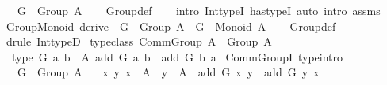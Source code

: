 \begin{isabellebody}
\ \ \ {\isachardoublequoteopen}G\ {\isacharcolon}{\kern0pt}\ Group\ A{\isachardoublequoteclose}\isanewline
%
\isadelimproof
\ \ %
\endisadelimproof
%
\isatagproof
{}\isamarkupfalse%
\ Group{\isacharunderscore}{\kern0pt}def\isanewline
\ \ \isamarkupfalse%
\ {\isacharparenleft}{\kern0pt}intro\ Int{\isacharunderscore}{\kern0pt}typeI\ has{\isacharunderscore}{\kern0pt}typeI{\isacharparenright}{\kern0pt}\ {\isacharparenleft}{\kern0pt}auto\ intro{\isacharcolon}{\kern0pt}\ assms{\isacharparenright}{\kern0pt}%
\endisatagproof
{\isafoldproof}%
%
\isadelimproof
\isanewline
%
\endisadelimproof
\isanewline
{}\isamarkupfalse%
\ Group{\isacharunderscore}{\kern0pt}Monoid\ {\isacharbrackleft}{\kern0pt}derive{\isacharbrackright}{\kern0pt}{\isacharcolon}{\kern0pt}\ \ {\isachardoublequoteopen}G\ {\isacharcolon}{\kern0pt}\ Group\ A\ {\isasymLongrightarrow}\ G\ {\isacharcolon}{\kern0pt}\ Monoid\ A{\isachardoublequoteclose}\isanewline
%
\isadelimproof
\ \ %
\endisadelimproof
%
\isatagproof
{}\isamarkupfalse%
\ Group{\isacharunderscore}{\kern0pt}def\ \isamarkupfalse%
\ {\isacharparenleft}{\kern0pt}drule\ Int{\isacharunderscore}{\kern0pt}typeD{}{\isacharparenright}{\kern0pt}{\isacharplus}{\kern0pt}%
\endisatagproof
{\isafoldproof}%
%
\isadelimproof
\isanewline
%
\endisadelimproof
\isanewline
{}\isamarkupfalse%
\ {\isacharbrackleft}{\kern0pt}typeclass{\isacharbrackright}{\kern0pt}{\isacharcolon}{\kern0pt}\ {\isachardoublequoteopen}Comm{\isacharunderscore}{\kern0pt}Group\ A\ {\isasymequiv}\ Group\ A\ {\isacharampersand}{\kern0pt}\isanewline
\ \ type\ {\isacharparenleft}{\kern0pt}{\isasymlambda}G{\isachardot}{\kern0pt}\ {\isasymforall}a\ b\ {\isacharcolon}{\kern0pt}\ A{\isachardot}{\kern0pt}\ add\ G\ a\ b\ {\isacharequal}{\kern0pt}\ add\ G\ b\ a{\isacharparenright}{\kern0pt}{\isachardoublequoteclose}\isanewline
\isanewline
{}\isamarkupfalse%
\ Comm{\isacharunderscore}{\kern0pt}GroupI\ {\isacharbrackleft}{\kern0pt}type{\isacharunderscore}{\kern0pt}intro{\isacharbrackright}{\kern0pt}{\isacharcolon}{\kern0pt}\isanewline
\ \ \ {\isachardoublequoteopen}G\ {\isacharcolon}{\kern0pt}\ Group\ A{\isachardoublequoteclose}\isanewline
\ \ \ {\isachardoublequoteopen}{\isasymAnd}x\ y{\isachardot}{\kern0pt}\ x\ {\isacharcolon}{\kern0pt}\ A\ {\isasymLongrightarrow}\ y\ {\isacharcolon}{\kern0pt}\ A\ {\isasymLongrightarrow}\ add\ G\ x\ y\ {\isacharequal}{\kern0pt}\ add\ G\ y\ x{\isachardoublequoteclose}\isanewline

\end{isabellebody}
